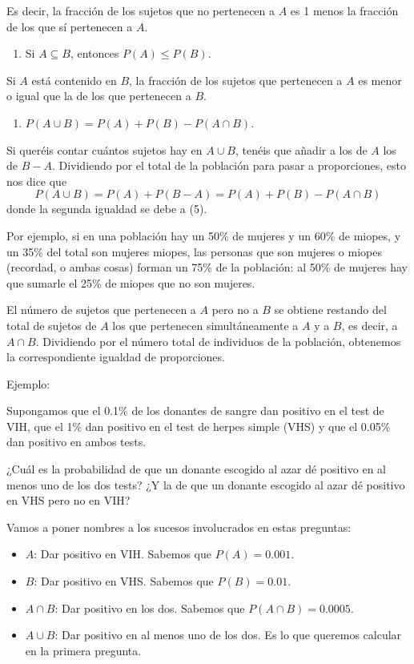 \documentclass[
  spanish,
  letterpaper,
  DIV=11,
  numbers=noendperiod]{scrreprt}
\providecommand{\tightlist}{%
  \setlength{\itemsep}{0pt}\setlength{\parskip}{0pt}}
\begin{document}
\begin{tcolorbox}
Es decir, la fracción de los sujetos que no pertenecen a \(A\) es 1
menos la fracción de los que sí pertenecen a \(A\).

\begin{enumerate}
\def\labelenumi{\arabic{enumi}.}
\setcounter{enumi}{6}
\tightlist
\item
  Si \(A\subseteq B\), entonces \(P(A)\leqslant P(B)\).
\end{enumerate}

Si \(A\) está contenido en \(B\), la fracción de los sujetos que
pertenecen a \(A\) es menor o igual que la de los que pertenecen a
\(B\).

\begin{enumerate}
\def\labelenumi{\arabic{enumi}.}
\setcounter{enumi}{7}
\tightlist
\item
  \(P(A\cup B)=P(A)+P(B)-P(A \cap B)\).
\end{enumerate}

Si queréis contar cuántos sujetos hay en \(A\cup B\), tenéis que añadir
a los de \(A\) los de \(B-A\). Dividiendo por el total de la población
para pasar a proporciones, esto nos dice que \[
P(A\cup B)=P(A)+P(B-A)=P(A)+P(B)-P(A \cap B)
\] donde la segunda igualdad se debe a (5).

Por ejemplo, si en una población hay un 50\% de mujeres y un 60\% de
miopes, y un 35\% del total son mujeres miopes, las personas que son
mujeres o miopes (recordad, o ambas cosas) forman un 75\% de la
población: al 50\% de mujeres hay que sumarle el 25\% de miopes que no
son mujeres.

El número de sujetos que pertenecen a \(A\) pero no a \(B\) se obtiene
restando del total de sujetos de \(A\) los que pertenecen
simultáneamente a \(A\) y a \(B\), es decir, a \(A\cap B\). Dividiendo
por el número total de individuos de la población, obtenemos la
correspondiente igualdad de proporciones.

Ejemplo:

Supongamos que el 0.1\% de los donantes de sangre dan positivo en el
test de VIH, que el 1\% dan positivo en el test de herpes simple (VHS) y
que el 0.05\% dan positivo en ambos tests.

¿Cuál es la probabilidad de que un donante escogido al azar dé positivo
en al menos uno de los dos tests? ¿Y la de que un donante escogido al
azar dé positivo en VHS pero no en VIH?

Vamos a poner nombres a los sucesos involucrados en estas preguntas:

\begin{itemize}
\item
  \(A\): Dar positivo en VIH. Sabemos que \(P(A)=0.001\).
\item
  \(B\): Dar positivo en VHS. Sabemos que \(P(B)=0.01\).
\item
  \(A\cap B\): Dar positivo en los dos. Sabemos que
  \(P(A\cap B)=0.0005\).
\item
  \(A\cup B\): Dar positivo en al menos uno de los dos. Es lo que
  queremos calcular en la primera pregunta.


\end{itemize}
\end{tcolorbox}
\end{document}
